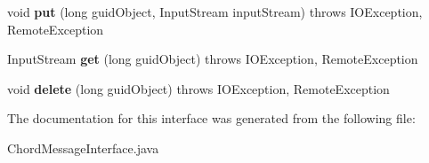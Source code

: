 \begin{DoxyCompactItemize}
void {\bfseries put} (long guid\+Object, Input\+Stream input\+Stream)  throws I\+O\+Exception, Remote\+Exception
\item 
\mbox{\label{interface_chord_message_interface_ad25e17fc24b4204afb6af590922bae5a}} 
Input\+Stream {\bfseries get} (long guid\+Object)  throws I\+O\+Exception, Remote\+Exception
\item 
\mbox{\label{interface_chord_message_interface_a2bd41258d7f62c5959907e4d3170fc70}} 
void {\bfseries delete} (long guid\+Object)  throws I\+O\+Exception, Remote\+Exception
\end{DoxyCompactItemize}


The documentation for this interface was generated from the following file\+:\begin{DoxyCompactItemize}
\item 
Chord\+Message\+Interface.\+java\end{DoxyCompactItemize}
